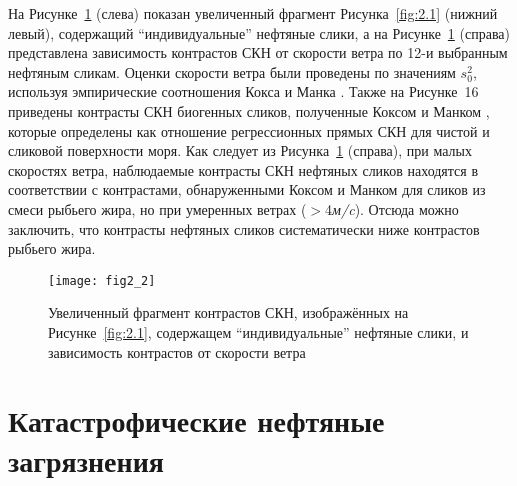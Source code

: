 На Рисунке~\ref{fig:2.2} (слева) показан увеличенный фрагмент Рисунка~\ref{fig:2.1} (нижний левый), содержащий ``индивидуальные'' нефтяные слики, а на Рисунке~\ref{fig:2.2} (справа) представлена зависимость контрастов СКН от скорости ветра по 12-и выбранным нефтяным сликам. Оценки скорости ветра были проведены по значениям $s_{0}^{2} $, используя эмпирические соотношения Кокса и Манка \citep{Cox1954, Cox1954a}. Также на Рисунке~16 приведены контрасты СКН биогенных сликов, полученные Коксом и Манком \citep{Cox1954a}, которые определены как отношение регрессионных прямых СКН для чистой и сликовой поверхности моря. Как следует из Рисунка~\ref{fig:2.2} (справа), при малых скоростях ветра, наблюдаемые контрасты СКН нефтяных сликов находятся в соответствии с контрастами, обнаруженными Коксом и Манком \citep{Cox1954, Cox1954a} для сликов из смеси рыбьего жира, но при умеренных ветрах ($>$4\textit{м/c}). Отсюда можно заключить, что контрасты нефтяных сликов систематически ниже контрастов рыбьего жира.



\begin{figure}[!thb]
 \texttt{[image: fig2\_2]}
 \caption{Увеличенный фрагмент контрастов СКН, изображённых на Рисунке~\ref{fig:2.1}, содержащем ``индивидуальные'' нефтяные слики, и зависимость контрастов от скорости ветра}
 \label{fig:2.2}
\end{figure}


\section{Катастрофические нефтяные загрязнения}

